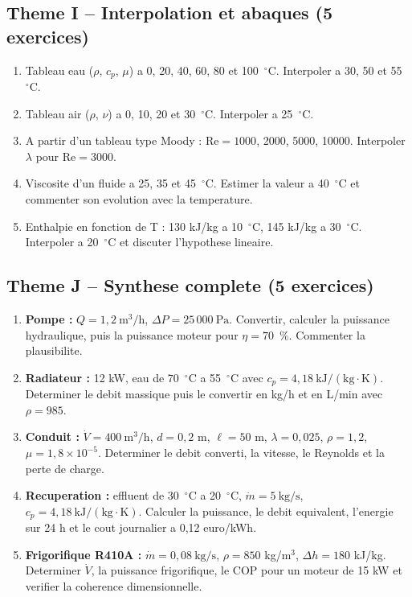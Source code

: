 \subsection*{Theme I -- Interpolation et abaques (5 exercices)}
\begin{enumerate}[label=\textbf{I\arabic*}, leftmargin=1.8cm, itemsep=0.4em]
  \item Tableau eau ($\rho$, $c_p$, $\mu$) a 0, 20, 40, 60, 80 et 100~$^\circ$C. Interpoler a 30, 50 et 55~$^\circ$C.
  \item Tableau air ($\rho$, $\nu$) a 0, 10, 20 et 30~$^\circ$C. Interpoler a 25~$^\circ$C.
  \item A partir d'un tableau type Moody : $\mathrm{Re} = 1000$, 2000, 5000, 10000. Interpoler $\lambda$ pour $\mathrm{Re} = 3000$.
  \item Viscosite d'un fluide a 25, 35 et 45~$^\circ$C. Estimer la valeur a 40~$^\circ$C et commenter son evolution avec la temperature.
  \item Enthalpie en fonction de T : 130 kJ/kg a 10~$^\circ$C, 145 kJ/kg a 30~$^\circ$C. Interpoler a 20~$^\circ$C et discuter l'hypothese lineaire.
\end{enumerate}

\subsection*{Theme J -- Synthese complete (5 exercices)}
\begin{enumerate}[label=\textbf{J\arabic*}, leftmargin=1.8cm, itemsep=0.4em]
  \item \textbf{Pompe :} $Q = 1{,}2~\mathrm{m^3/h}$, $\Delta P = 25\,000~\mathrm{Pa}$. Convertir, calculer la puissance hydraulique, puis la puissance moteur pour $\eta = 70$~\%. Commenter la plausibilite.
  \item \textbf{Radiateur :} 12 kW, eau de 70~$^\circ$C a 55~$^\circ$C avec $c_p = 4{,}18~\mathrm{kJ/(kg \cdot K)}$. Determiner le debit massique puis le convertir en kg/h et en L/min avec $\rho = 985$.
  \item \textbf{Conduit :} $\dot{V} = 400~\mathrm{m^3/h}$, $d = 0{,}2$ m, $\ell = 50$ m, $\lambda = 0{,}025$, $\rho = 1{,}2$, $\mu = 1{,}8 \times 10^{-5}$. Determiner le debit converti, la vitesse, le Reynolds et la perte de charge.
  \item \textbf{Recuperation :} effluent de 30~$^\circ$C a 20~$^\circ$C, $\dot{m} = 5~\mathrm{kg/s}$, $c_p = 4{,}18~\mathrm{kJ/(kg \cdot K)}$. Calculer la puissance, le debit equivalent, l'energie sur 24 h et le cout journalier a 0,12 euro/kWh.
  \item \textbf{Frigorifique R410A :} $\dot{m} = 0{,}08~\mathrm{kg/s}$, $\rho = 850$ kg/m$^3$, $\Delta h = 180$ kJ/kg. Determiner $\dot{V}$, la puissance frigorifique, le COP pour un moteur de 15 kW et verifier la coherence dimensionnelle.
\end{enumerate}

